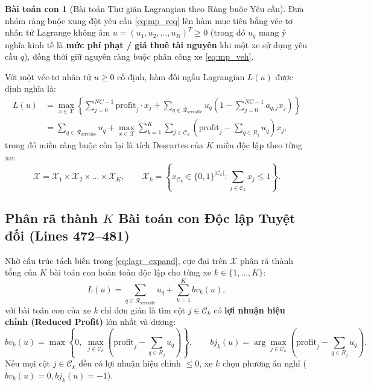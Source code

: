 \documentclass[11pt,a4paper]{article}
\theoremstyle{definition}
\newtheorem{subproblem}{Bài toán con}[section]
\begin{document}
\begin{subproblem}[Bài toán Thư giãn Lagrangian theo Ràng buộc Yêu cầu]
Đưa nhóm ràng buộc xung đột yêu cầu \eqref{eq:mp_req} lên hàm mục tiêu bằng véc-tơ nhân tử Lagrange không âm $u = (u_1, u_2, \dots, u_R)^T \ge 0$ (trong đó $u_q$ mang ý nghĩa kinh tế là \textbf{mức phí phạt / giá thuê tài nguyên} khi một xe sử dụng yêu cầu $q$), đồng thời giữ nguyên ràng buộc phân công xe \eqref{eq:mp_veh}.
\end{subproblem}

Với một véc-tơ nhân tử $u \ge 0$ cố định, hàm đối ngẫu Lagrangian $L(u)$ được định nghĩa là:
\begin{align}
    L(u) &= \max_{x \in \mathcal{X}} \left\{ \sum_{j=0}^{NC-1} \text{profit}_j \cdot x_j + \sum_{q \in \mathcal{R}_{\text{servable}}} u_q \left( 1 - \sum_{j=0}^{NC-1} a_{q, j} x_j \right) \right\} \nonumber\\
    &= \sum_{q \in \mathcal{R}_{\text{servable}}} u_q + \max_{x \in \mathcal{X}} \sum_{k=1}^K \sum_{j \in \mathcal{C}_k} \left( \text{profit}_j - \sum_{q \in R_j} u_q \right) x_j, \label{eq:lagr_expand}
\end{align}
trong đó miền ràng buộc còn lại là tích Descartes của $K$ miền độc lập theo từng xe:
\[
    \mathcal{X} = \mathcal{X}_1 \times \mathcal{X}_2 \times \dots \times \mathcal{X}_K, \qquad \mathcal{X}_k = \left\{ x_{\mathcal{C}_k} \in \{0, 1\}^{|\mathcal{C}_k|} : \sum_{j \in \mathcal{C}_k} x_j \le 1 \right\}.
\]

\subsection{Phân rã thành $K$ Bài toán con Độc lập Tuyệt đối (Lines 472--481)}
Nhờ cấu trúc tách biến trong \eqref{eq:lagr_expand}, cực đại trên $\mathcal{X}$ phân rã thành tổng của $K$ bài toán con hoàn toàn độc lập cho từng xe $k \in \{1, \dots, K\}$:
\begin{equation}
    L(u) = \sum_{q \in \mathcal{R}_{\text{servable}}} u_q + \sum_{k=1}^K bv_k(u),
    \label{eq:lagr_decomp}
\end{equation}
với bài toán con của xe $k$ chỉ đơn giản là tìm cột $j \in \mathcal{C}_k$ có \textbf{lợi nhuận hiệu chỉnh (Reduced Profit)} lớn nhất và dương:
\begin{equation}
    bv_k(u) = \max\left\{ 0, \; \max_{j \in \mathcal{C}_k} \left( \text{profit}_j - \sum_{q \in R_j} u_q \right) \right\}, \qquad bj_k(u) = \arg\max_{j \in \mathcal{C}_k} \left( \text{profit}_j - \sum_{q \in R_j} u_q \right).
    \label{eq:veh_subproblem}
\end{equation}
Nếu mọi cột $j \in \mathcal{C}_k$ đều có lợi nhuận hiệu chỉnh $\le 0$, xe $k$ chọn phương án nghỉ ($bv_k(u) = 0, bj_k(u) = -1$).
\end{document}
